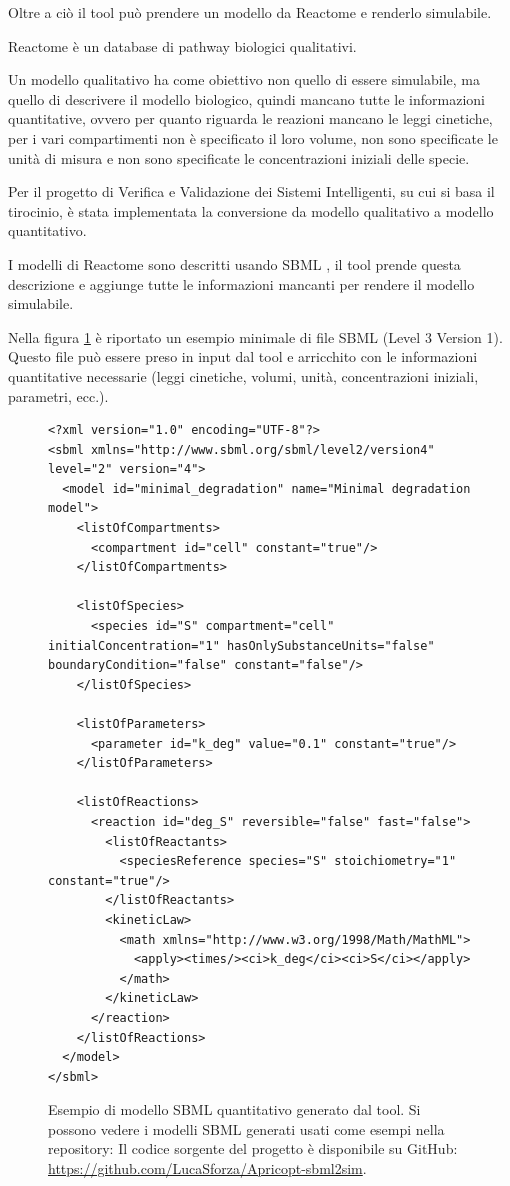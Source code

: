 Oltre a ciò il tool può prendere un modello da Reactome \cite{milacic2024reactome} e renderlo simulabile.

Reactome è un database di pathway biologici qualitativi.

Un modello qualitativo ha come obiettivo non quello di essere simulabile, ma quello di descrivere il
modello biologico, quindi mancano tutte le informazioni quantitative, ovvero per quanto
riguarda le reazioni mancano le leggi cinetiche, per i vari compartimenti non è specificato il loro
volume, non sono specificate le unità di misura e non sono specificate le concentrazioni iniziali delle
specie.

Per il progetto di Verifica e Validazione dei Sistemi Intelligenti, su cui si basa il tirocinio, è stata implementata
la conversione da modello qualitativo a modello quantitativo.

I modelli di Reactome sono descritti usando SBML \cite{hucka2003sbml} , il tool prende questa descrizione e aggiunge tutte le informazioni mancanti
per rendere il modello simulabile.

Nella figura \ref{fig:sbml} è riportato un esempio minimale di file SBML (Level 3 Version 1). Questo file può essere preso in input dal tool e arricchito con le informazioni quantitative necessarie (leggi cinetiche, volumi, unità, concentrazioni iniziali, parametri, ecc.).
\begin{figure} 
\begin{verbatim}
<?xml version="1.0" encoding="UTF-8"?>
<sbml xmlns="http://www.sbml.org/sbml/level2/version4" level="2" version="4">
  <model id="minimal_degradation" name="Minimal degradation model">
    <listOfCompartments>
      <compartment id="cell" constant="true"/>
    </listOfCompartments>

    <listOfSpecies>
      <species id="S" compartment="cell" initialConcentration="1" hasOnlySubstanceUnits="false" boundaryCondition="false" constant="false"/>
    </listOfSpecies>

    <listOfParameters>
      <parameter id="k_deg" value="0.1" constant="true"/>
    </listOfParameters>

    <listOfReactions>
      <reaction id="deg_S" reversible="false" fast="false">
        <listOfReactants>
          <speciesReference species="S" stoichiometry="1" constant="true"/>
        </listOfReactants>
        <kineticLaw>
          <math xmlns="http://www.w3.org/1998/Math/MathML">
            <apply><times/><ci>k_deg</ci><ci>S</ci></apply>
          </math>
        </kineticLaw>
      </reaction>
    </listOfReactions>
  </model>
</sbml>
\end{verbatim}
\caption{Esempio di modello SBML quantitativo generato dal tool. Si possono vedere i modelli SBML generati usati come esempi nella repository: Il codice sorgente del progetto è disponibile su GitHub:
\href{https://github.com/LucaSforza/Apricopt-sbml2sim}{https://github.com/LucaSforza/Apricopt-sbml2sim}.}
\label{fig:sbml}
\end{figure}



